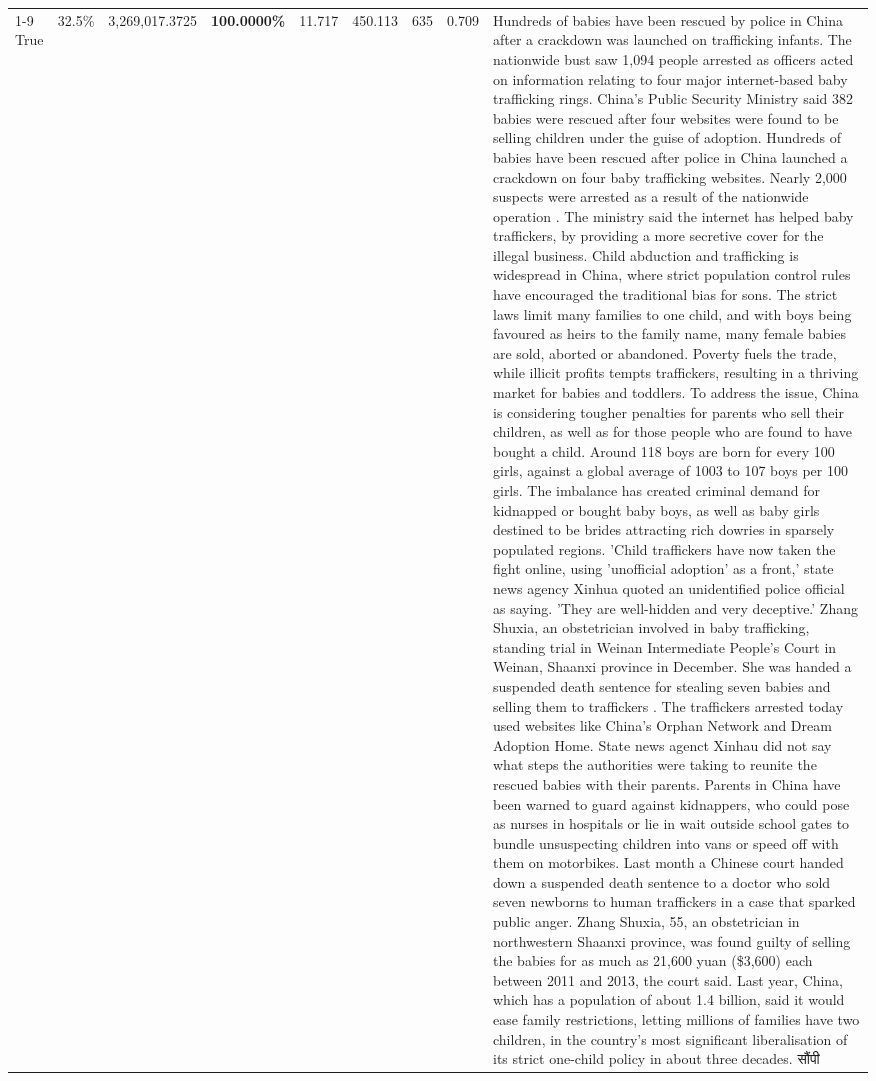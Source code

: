\begin{table}[H]
\begin{tabular}{lllrlllll}
\cline{1-9}
True & 32.5\% & 3,269,017.3725 & \bfseries \color{red} 100.0000\% & 11.717 & 450.113 & 635 & 0.709 & Hundreds of babies have been rescued by police in China after a crackdown was launched on trafficking infants. The nationwide bust saw 1,094 people arrested as officers acted on information relating to four major internet-based baby trafficking rings. China's Public Security Ministry said 382 babies were rescued after four websites were found to be selling children under the guise of adoption. Hundreds of babies have been rescued after police in China launched a crackdown on four baby trafficking websites. Nearly 2,000 suspects were arrested as a result of the nationwide operation . The ministry said the internet has helped baby traffickers, by providing a more secretive cover for the illegal business. Child abduction and trafficking is widespread in China, where strict population control rules have encouraged the traditional bias for sons. The strict laws limit many families to one child, and with boys being favoured as heirs to the family name, many female babies are sold, aborted or abandoned. Poverty fuels the trade, while illicit profits tempts traffickers, resulting in a thriving market for babies and toddlers. To address the issue, China is considering tougher penalties for parents who sell their children, as well as for those people who are found to have bought a child. Around 118 boys are born for every 100 girls, against a global average of 1003 to 107 boys per 100 girls. The imbalance has created criminal demand for kidnapped or bought baby boys, as well as baby girls destined to be brides attracting rich dowries in sparsely populated regions. 'Child traffickers have now taken the fight online, using 'unofficial adoption' as a front,' state news agency Xinhua quoted an unidentified police official as saying. 'They are well-hidden and very deceptive.' Zhang Shuxia, an obstetrician involved in baby trafficking, standing trial in Weinan Intermediate People's Court in Weinan, Shaanxi province in December. She was handed a suspended death sentence for stealing seven babies and selling them to traffickers . The traffickers arrested today used websites like China's Orphan Network and Dream Adoption Home. State news agenct Xinhau did not say what steps the authorities were taking to reunite the rescued babies with their parents. Parents in China have been warned to guard against kidnappers, who could pose as nurses in hospitals or lie in wait outside school gates to bundle unsuspecting children into vans or speed off with them on motorbikes. Last month a Chinese court handed down a suspended death sentence to a doctor who sold seven newborns to human traffickers in a case that sparked public anger. Zhang Shuxia, 55, an obstetrician in northwestern Shaanxi province, was found guilty of selling the babies for as much as 21,600 yuan (\$3,600) each between 2011 and 2013, the court said. Last year, China, which has a population of about 1.4 billion, said it would ease family restrictions, letting millions of families have two children, in the country's most significant liberalisation of its strict one-child policy in about three decades. सौंपी \\

\end{tabular}
\end{table}
